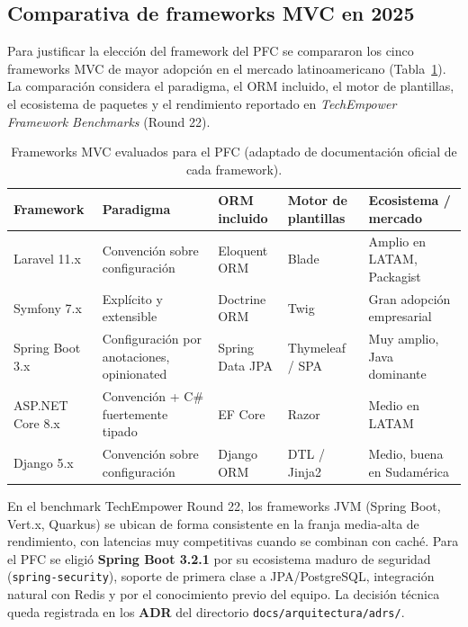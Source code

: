 \subsection{Comparativa de frameworks MVC en 2025}

Para justificar la elección del framework del PFC se compararon los cinco frameworks MVC de mayor adopción en el
mercado latinoamericano (Tabla~\ref{tab:frameworks}). La comparación considera el paradigma, el ORM incluido, el
motor de plantillas, el ecosistema de paquetes y el rendimiento reportado en \textit{TechEmpower Framework
Benchmarks} (Round 22).

\begin{table}[H]
\centering
\small
\setlength{\tabcolsep}{5pt}
\begin{tabular}{@{}p{2.6cm}p{3.4cm}p{2.6cm}p{2.6cm}p{3.2cm}@{}}
\toprule
\textbf{Framework} & \textbf{Paradigma} & \textbf{ORM incluido} & \textbf{Motor de plantillas} & \textbf{Ecosistema / mercado} \\
\midrule
Laravel 11.x & Convención sobre configuración & Eloquent ORM & Blade & Amplio en LATAM, Packagist \\
Symfony 7.x & Explícito y extensible & Doctrine ORM & Twig & Gran adopción empresarial \\
Spring Boot 3.x & Configuración por anotaciones, opinionated & Spring Data JPA & Thymeleaf / SPA & Muy amplio, Java dominante \\
ASP.NET Core 8.x & Convención + C\# fuertemente tipado & EF Core & Razor & Medio en LATAM \\
Django 5.x & Convención sobre configuración & Django ORM & DTL / Jinja2 & Medio, buena en Sudamérica \\
\bottomrule
\end{tabular}
\caption{Frameworks MVC evaluados para el PFC (adaptado de documentación oficial de cada framework).}
\label{tab:frameworks}
\end{table}

En el benchmark TechEmpower Round 22, los frameworks JVM (Spring Boot, Vert.x, Quarkus) se ubican de forma
consistente en la franja media-alta de rendimiento, con latencias muy competitivas cuando se combinan con caché.
Para el PFC se eligió \textbf{Spring Boot 3.2.1} por su ecosistema maduro de seguridad (\texttt{spring-security}),
soporte de primera clase a JPA/PostgreSQL, integración natural con Redis y por el conocimiento previo del equipo.
La decisión técnica queda registrada en los \textbf{ADR} del directorio \texttt{docs/arquitectura/adrs/}.
